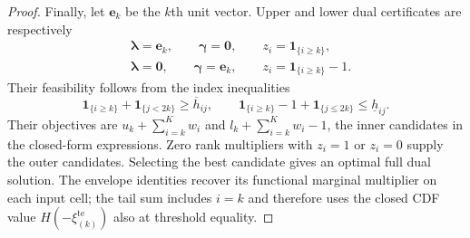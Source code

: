 \begin{proof}
  Finally, let $\bm e_k$ be the $k$th unit vector. Upper and lower dual certificates are respectively
  \begin{align*}
    &\bm\lambda=\bm e_k,\qquad\bm\gamma=\bm0,\qquad
      z_i=\mathbf1_{\{i\ge k\}},\\
    &\bm\lambda=\bm0,\qquad\bm\gamma=\bm e_k,\qquad
      z_i=\mathbf1_{\{i\ge k\}}-1.
  \end{align*}
  Their feasibility follows from the index inequalities
  \[
    \mathbf1_{\{i\ge k\}}+\mathbf1_{\{j<2k\}}\ge\overline h_{ij},
    \qquad
    \mathbf1_{\{i\ge k\}}-1+\mathbf1_{\{j\le2k\}}\le\underline h_{ij}.
  \]
  Their objectives are $u_k+\sum_{i=k}^{K}w_i$ and $l_k+\sum_{i=k}^{K}w_i-1$, the inner candidates in the closed-form expressions. Zero rank multipliers with $z_i=1$ or $z_i=0$ supply the outer candidates. Selecting the best candidate gives an optimal full dual solution. The envelope identities recover its functional marginal multiplier on each input cell; the tail sum includes $i=k$ and therefore uses the closed CDF value $H\left(-\xi_{(k)}^{\mathrm{te}}\right)$ also at threshold equality.
\end{proof}


